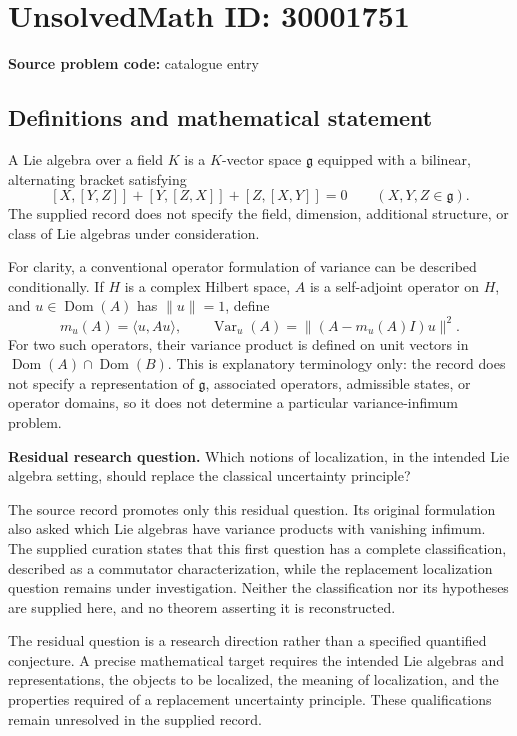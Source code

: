 \documentclass[11pt]{article}
\begin{document}
\section*{UnsolvedMath ID: 30001751}
\textbf{Source problem code:} catalogue entry
\subsection{Definitions and mathematical statement}
A Lie algebra over a field \(K\) is a \(K\)-vector space \(\mathfrak g\) equipped with a bilinear, alternating bracket satisfying
\[
[X,[Y,Z]]+[Y,[Z,X]]+[Z,[X,Y]]=0
\qquad (X,Y,Z\in\mathfrak g).
\]
The supplied record does not specify the field, dimension, additional structure, or class of Lie algebras under consideration.

For clarity, a conventional operator formulation of variance can be described conditionally. If \(H\) is a complex Hilbert space, \(A\) is a self-adjoint operator on \(H\), and \(u\in\operatorname{Dom}(A)\) has \(\|u\|=1\), define
\[
m_u(A)=\langle u,Au\rangle,
\qquad
\operatorname{Var}_u(A)=\|(A-m_u(A)I)u\|^2.
\]
For two such operators, their variance product is defined on unit vectors in \(\operatorname{Dom}(A)\cap\operatorname{Dom}(B)\). This is explanatory terminology only: the record does not specify a representation of \(\mathfrak g\), associated operators, admissible states, or operator domains, so it does not determine a particular variance-infimum problem.

\textbf{Residual research question.} Which notions of localization, in the intended Lie algebra setting, should replace the classical uncertainty principle?

The source record promotes only this residual question. Its original formulation also asked which Lie algebras have variance products with vanishing infimum. The supplied curation states that this first question has a complete classification, described as a commutator characterization, while the replacement localization question remains under investigation. Neither the classification nor its hypotheses are supplied here, and no theorem asserting it is reconstructed.

The residual question is a research direction rather than a specified quantified conjecture. A precise mathematical target requires the intended Lie algebras and representations, the objects to be localized, the meaning of localization, and the properties required of a replacement uncertainty principle. These qualifications remain unresolved in the supplied record.
\end{document}
